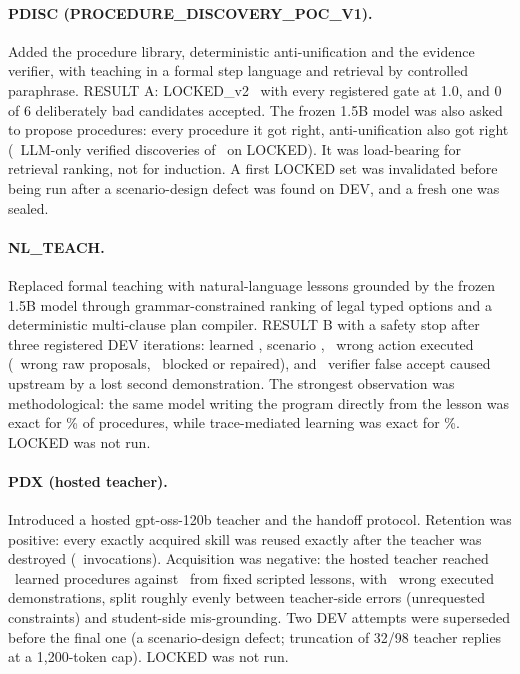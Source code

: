 \documentclass[10pt]{article}
\begin{document}
\paragraph{PDISC (PROCEDURE\_DISCOVERY\_POC\_V1).} Added the procedure library, deterministic anti-unification and the evidence verifier, with teaching in a formal step language and retrieval by controlled paraphrase. RESULT A: LOCKED\_v2 \pdLocked\ with every registered gate at 1.0, and 0 of 6 deliberately bad candidates accepted. The frozen 1.5B model was also asked to propose procedures: every procedure it got right, anti-unification also got right (\pdLlmOnly\ LLM-only verified discoveries of \pdDiscoveries\ on LOCKED). It was load-bearing for retrieval ranking, not for induction. A first LOCKED set was invalidated before being run after a scenario-design defect was found on DEV, and a fresh one was sealed.

\paragraph{NL\_TEACH.} Replaced formal teaching with natural-language lessons grounded by the frozen 1.5B model through grammar-constrained ranking of legal typed options and a deterministic multi-clause plan compiler. RESULT B with a safety stop after three registered DEV iterations: learned \nlLearned, scenario \nlScenario, \nlWrongExec\ wrong action executed (\nlWrongProposed\ wrong raw proposals, \nlWrongBlocked\ blocked or repaired), and \nlFalseAccept\ verifier false accept caused upstream by a lost second demonstration. The strongest observation was methodological: the same model writing the program directly from the lesson was exact for \nlDirect\% of procedures, while trace-mediated learning was exact for \nlTrace\%. LOCKED was not run.

\paragraph{PDX (hosted teacher).} Introduced a hosted gpt-oss-120b teacher and the handoff protocol. Retention was positive: every exactly acquired skill was reused exactly after the teacher was destroyed (\pdxRetention\ invocations). Acquisition was negative: the hosted teacher reached \pdxTeacherLearned\ learned procedures against \pdxScriptedLearned\ from fixed scripted lessons, with \pdxWrong\ wrong executed demonstrations, split roughly evenly between teacher-side errors (unrequested constraints) and student-side mis-grounding. Two DEV attempts were superseded before the final one (a scenario-design defect; truncation of 32/98 teacher replies at a 1{,}200-token cap). LOCKED was not run.
\end{document}
